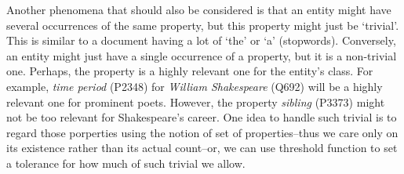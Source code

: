 

Another phenomena that should also be considered is that an entity might have several occurrences of the same property, but this property might just be `trivial'. This is similar to a document having a lot of `the' or `a' (stopwords). Conversely, an entity might just have a single occurrence of a property, but it is a non-trivial one. Perhaps, the property is a highly relevant one for the entity's class. For example, \textit{time period} (P2348) for \textit{William Shakespeare} (Q692) will be a highly relevant one for prominent poets. However, the property \textit{sibling} (P3373) might not be too relevant for Shakespeare's career. One idea to handle such trivial is to regard those porperties using the notion of set of properties--thus we care only on its existence rather than its actual count--or, we can use threshold function to set a tolerance for how much of such trivial we allow.





